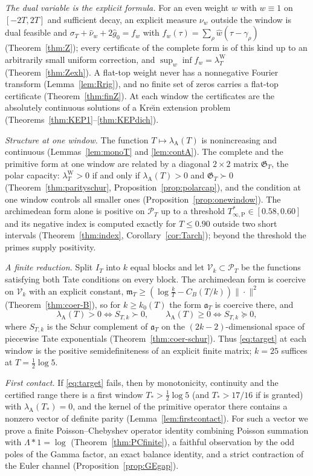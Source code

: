 \documentclass[11pt]{amsart}
\theoremstyle{definition}
\theoremstyle{remark}
\newcommand{\PT}{\mathcal P_T}
\newcommand{\IT}{I_T}
\newcommand{\lamW}{\lambda^{\mathrm W}_T}
\newcommand{\lamA}{\lambda_{\mathrm A}(T)}
\newcommand{\sT}{\sigma_T}
\newcommand{\gh}[1]{\widehat g_{#1}}
\newcommand{\nuh}{\widehat\nu}
\newcommand{\wh}{\widehat w}
\begin{document}
\emph{The dual variable is the explicit formula.} For an even weight $w$ with $w\equiv1$ on $[-2T,2T]$
and sufficient decay, an explicit measure $\nu_w$ outside the window is dual feasible and
$\sT+\nuh_w+2\gh0=f_w$ with $f_w(\tau)=\sum_\rho\wh(\tau-\gamma_\rho)$ (Theorem~\ref{thm:Z}); every
certificate of the complete form is of this kind up to an arbitrarily small uniform correction, and
$\sup_w\inf f_w=\lamW$ (Theorem~\ref{thm:Zexh}). A flat-top weight never has a nonnegative Fourier
transform (Lemma~\ref{lem:Rrig}), and no finite set of zeros carries a flat-top certificate
(Theorem~\ref{thm:finZ}). At each window the certificates are the absolutely continuous solutions of a
Kre\u{\i}n extension problem (Theorems~\ref{thm:KEP1}--\ref{thm:KEPdich}).

\emph{Structure at one window.} The function $T\mapsto\lamA$ is nonincreasing and continuous
(Lemmas~\ref{lem:monoT} and \ref{lem:contA}). The complete and the primitive form at one window are related
by a diagonal $2\times2$ matrix $\mathfrak G_T$, the polar capacity: $\lamW>0$ if and only if $\lamA>0$
and $\mathfrak G_T\succ0$ (Theorem~\ref{thm:parityschur}, Proposition~\ref{prop:polarcap}), and the
condition at one window controls all smaller ones (Proposition~\ref{prop:onewindow}). The archimedean form
alone is positive on $\PT$ up to a threshold $T^*_{\infty,\mathrm P}\in[0.58,0.60]$ and its negative index
is computed exactly for $T\le0.90$ outside two short intervals (Theorem~\ref{thm:index},
Corollary~\ref{cor:Tarch}); beyond the threshold the primes supply positivity.

\emph{A finite reduction.} Split $\IT$ into $k$ equal blocks and let $\mathcal V_k\subset\PT$ be the
functions satisfying both Tate conditions on every block. The archimedean form is coercive on
$\mathcal V_k$ with an explicit constant, $\mathfrak m_T\ge(\log\frac kT-C_B(T/k))\|\cdot\|^2$
(Theorem~\ref{thm:coer-B}), so for $k\ge k_0(T)$ the form $\mathfrak a_T$ is coercive there, and
\[
\lamA>0\iff S_{T,k}\succ0,\qquad \lamA\ge0\iff S_{T,k}\succeq0,
\]
where $S_{T,k}$ is the Schur complement of $\mathfrak a_T$ on the $(2k-2)$-dimensional space of piecewise
Tate exponentials (Theorem~\ref{thm:coer-schur}). Thus \eqref{eq:target} at each window is the positive
semidefiniteness of an explicit finite matrix; $k=25$ suffices at $T=\frac12\log5$.

\emph{First contact.} If \eqref{eq:target} fails, then by monotonicity, continuity and the certified range
there is a first window $T_*>\frac12\log5$ (and $T_*>17/16$ if \cite[Thm.~B]{Liu2026} is granted) with $\lambda_{\mathrm A}(T_*)=0$, and the kernel of the
primitive operator there contains a nonzero vector of definite parity (Lemma~\ref{lem:firstcontact}). For
such a vector we prove a finite Poisson--Chebyshev operator identity combining Poisson summation with
$\Lambda*1=\log$ (Theorem~\ref{thm:PCfinite}), a faithful observation by the odd poles of the Gamma factor,
an exact balance identity, and a strict contraction of the Euler channel (Proposition~\ref{prop:GEgap}).
\end{document}
